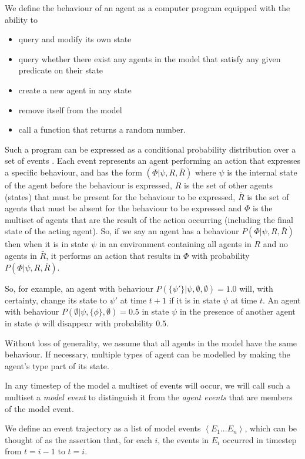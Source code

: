 \documentclass{article}
\begin{document}
We define the behaviour of an agent as a computer program equipped with the ability to
\begin{itemize}
\item query and modify its own state
\item query whether there exist any agents in the model that satisfy any given predicate on their state
\item create a new agent in any state
\item remove itself from the model
\item call a function that returns a random number.
\end{itemize}
Such a program can be expressed as a conditional probability distribution over a set of events \cite{staton2016semantics}. Each event represents an agent performing an action that expresses a specific behaviour, and has the form $(\Phi|\psi,R,\bar{R})$ where $\psi$ is the internal state of the agent before the behaviour is expressed, $R$ is the set of other agents (states) that must be present for the behaviour to be expressed, $\bar{R}$ is the set of agents that must be absent for the behaviour to be expressed and $\Phi$ is the multiset of agents that are the result of the action occurring (including the final state of the acting agent). So, if we say an agent has a behaviour $P(\Phi|\psi,R,\bar{R})$ then when it is in state $\psi$ in an environment containing all agents in $R$ and no agents in $\bar{R}$, it performs an action that results in $\Phi$ with probability $P(\Phi|\psi,R,\bar{R})$.

So, for example, an agent with behaviour $P(\{\psi'\}|\psi,\emptyset,\emptyset) = 1.0$ will, with certainty, change its state to $\psi'$ at time $t+1$ if it is in state $\psi$ at time $t$. An agent with behaviour $P(\emptyset|\psi,\{\phi\},\emptyset) = 0.5$ in state $\psi$ in the presence of another agent in state $\phi$ will disappear with probability $0.5$.

Without loss of generality, we assume that all agents in the model have the same behaviour. If necessary, multiple types of agent can be modelled by making the agent's type part of its state.

In any timestep of the model a multiset of events will occur, we will call such a multiset a \textit{model event} to distinguish it from the \textit{agent events} that are members of the model event.

We define an event trajectory as a list of model events $\left<E_1...E_n\right>$, which can be thought of as the assertion that, for each $i$, the events in $E_i$ occurred in timestep from $t=i-1$ to $t=i$. 
\end{document}
